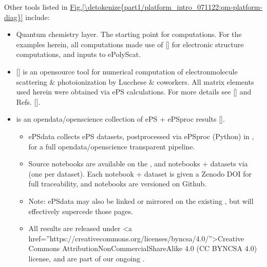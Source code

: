 \documentclass[letterpaper,10pt,english]{jupyterBook}
\begin{document}
\sphinxAtStartPar
Other tools listed in \hyperref[\detokenize{part1/platform_intro_071122:qm-platform-diag}]{Fig.\@ \ref{\detokenize{part1/platform_intro_071122:qm-platform-diag}}} include:
\begin{itemize}
\item {} 
\sphinxAtStartPar
Quantum chemistry layer. The starting point for  computations. For the examples herein, all computations made use of  {[}{]} for electronic structure computations, and inputs to ePolyScat.

\item {} 
\sphinxAtStartPar
{} {[}{]} is an open\sphinxhyphen{}source tool for numerical computation of electron\sphinxhyphen{}molecule scattering \& photoionization by Lucchese \& coworkers. All matrix elements used herein were obtained via ePS calculations. For more details see  {[}{]} and Refs. {[}{]}.

\item {} 
\sphinxAtStartPar
{} is an open\sphinxhyphen{}data/open\sphinxhyphen{}science collection of ePS + ePSproc results {[}{]}.
\begin{itemize}
\item {} 
\sphinxAtStartPar
ePSdata collects ePS datasets, post\sphinxhyphen{}processed via ePSproc (Python) in , for a full open\sphinxhyphen{}data/open\sphinxhyphen{}science transparent pipeline.

\end{itemize}
\begin{itemize}
\item {} 
\sphinxAtStartPar
Source notebooks are available on the , and notebooks + datasets via  (one per dataset). Each notebook + dataset is given a Zenodo DOI for full traceability, and notebooks are versioned on Github.

\item {} 
\sphinxAtStartPar
Note: ePSdata may also be linked or mirrored on the existing , but will effectively supercede those pages.

\item {} 
\sphinxAtStartPar
All results are released under <a href=”https://creativecommons.org/licenses/by\sphinxhyphen{}nc\sphinxhyphen{}sa/4.0/”>Creative Commons Attribution\sphinxhyphen{}NonCommercial\sphinxhyphen{}ShareAlike 4.0 (CC BY\sphinxhyphen{}NC\sphinxhyphen{}SA 4.0) license, and are part of our ongoing .

\end{itemize}

\end{itemize}
\end{document}
